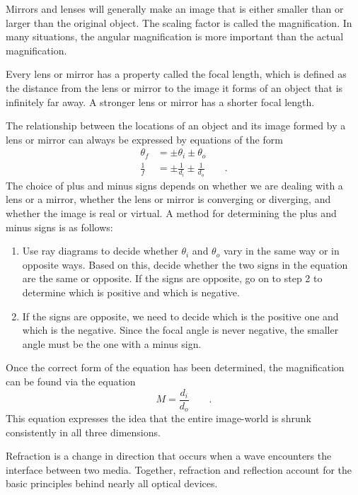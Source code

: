Mirrors and lenses will generally make an image that is
either smaller than or larger than the original object. The
scaling factor is called the magnification. In many
situations, the angular magnification is more important than
the actual magnification.

Every lens or mirror has a property called the focal length,
which is defined as the distance from the lens or mirror to
the image it forms of an object that is infinitely far away.
A stronger lens or mirror has a shorter focal length.

The relationship between the locations of an object and its
image formed by a lens or mirror can always be expressed by
equations of the form
\begin{align*}
                        \theta_f &= \pm \theta_i \pm \theta_o \\
        \frac{1}{f} &= \pm\frac{1}{d_i}\pm\frac{1}{d_o}  \qquad .
\end{align*}
The choice of plus and minus signs depends on whether we are
dealing with a lens or a mirror, whether the lens or mirror
is converging or diverging, and whether the image is real or
virtual. A method for determining the plus and minus
signs is as follows:

\begin{enumerate}

\item Use ray diagrams to decide whether $\theta_i$ and
$\theta_o$ vary in the same way or in opposite ways. Based
on this, decide whether the two signs in the equation are
the same or opposite. If the signs are opposite, go on to
step 2 to determine which is positive and which is negative.

\item If the signs are opposite, we need to decide which is the
positive one and which is the negative. Since the focal
angle is never negative, the smaller angle must be the
one with a minus sign.

\end{enumerate}

Once the correct form of the equation has been determined,
the magnification can be found via the equation
\begin{equation*}
                M    =    \frac{d_i}{d_o}   \qquad   .
\end{equation*}
This equation expresses the idea that the entire image-world is shrunk
consistently in all three dimensions.

Refraction is a change in direction that occurs when a wave
encounters the interface between two media. Together,
refraction and reflection account for the basic principles
behind nearly all optical devices.

